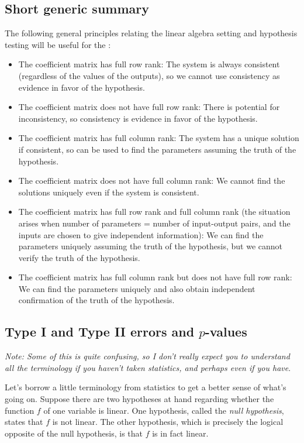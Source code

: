 \documentclass[10pt]{amsart}
\begin{document}
\subsection{Short generic summary}

The following general principles relating the linear algebra setting
and hypothesis testing will be useful for the :

\begin{itemize}
\item The coefficient matrix has full row rank: The system is always
  consistent (regardless of the values of the outputs), so we cannot use
  consistency as evidence in favor of the hypothesis.
\item The coefficient matrix does not have full row rank: There is
  potential for inconsistency, so consistency is evidence in favor of
  the hypothesis.
\item The coefficient matrix has full column rank: The system has a
  unique solution if consistent, so can be used to find the parameters
  assuming the truth of the hypothesis.
\item The coefficient matrix does not have full column rank: We cannot
  find the solutions uniquely even if the system is consistent.
\item The coefficient matrix has full row rank and full column rank
  (the situation arises when number of parameters = number of
  input-output pairs, and the inputs are chosen to give independent
  information): We can find the parameters uniquely assuming the truth
  of the hypothesis, but we cannot verify the truth of the hypothesis.
\item The coefficient matrix has full column rank but does not have
  full row rank: We can find the parameters uniquely and also obtain
  independent confirmation of the truth of the hypothesis.
\end{itemize}

\subsection{Type I and Type II errors and $p$-values}

{\em Note: Some of this is quite confusing, so I don't really expect
  you to understand all the terminology if you haven't taken
  statistics, and perhaps even if you have}.

Let's borrow a little terminology from statistics to get a better
sense of what's going on. Suppose there are two hypotheses at hand
regarding whether the function $f$ of one variable is linear. One
hypothesis, called the {\em null hypothesis}, states that $f$ is not
linear. The other hypothesis, which is precisely the logical opposite
of the null hypothesis, is that $f$ is in fact linear.
 
\end{document}
